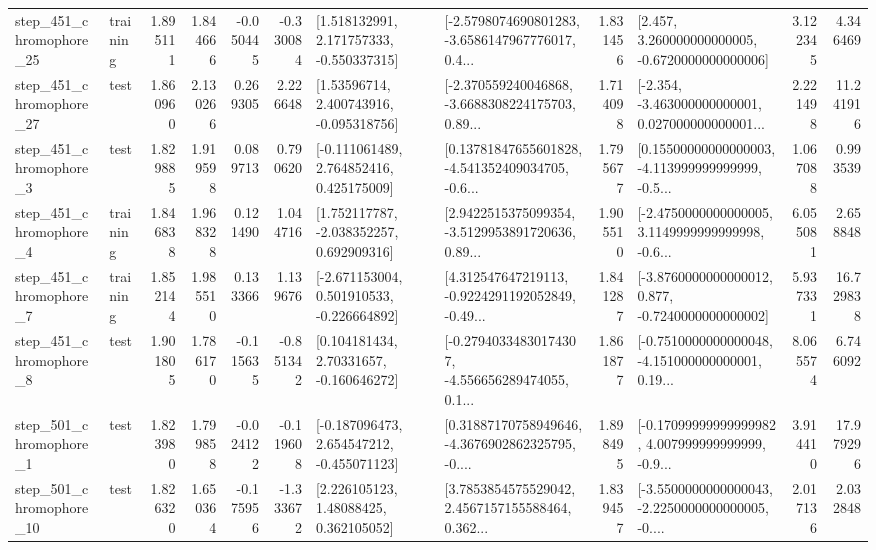 \begin{tabular}{llrrrrllrlrr}
  step\_451\_chromophore\_25 &  training &      1.895111 &    1.844666 &     -0.050445 & -0.330084 &    [1.518132991, 2.171757333, -0.550337315] &  [-2.5798074690801283, -3.6586147967776017, 0.4... &       1.831456 &    [2.457, 3.260000000000005, -0.6720000000000006] &            3.122345 &          4.346469 \\
  step\_451\_chromophore\_27 &      test &      1.860960 &    2.130266 &      0.269305 &  2.226648 &     [1.53596714, 2.400743916, -0.095318756] &  [-2.370559240046868, -3.6688308224175703, 0.89... &       1.714098 &  [-2.354, -3.463000000000001, 0.027000000000001... &            2.221498 &         11.241916 \\
   step\_451\_chromophore\_3 &      test &      1.829885 &    1.919598 &      0.089713 &  0.790620 &    [-0.111061489, 2.764852416, 0.425175009] &  [0.13781847655601828, -4.541352409034705, -0.6... &       1.795677 &  [0.15500000000000003, -4.113999999999999, -0.5... &            1.067088 &          0.993539 \\
   step\_451\_chromophore\_4 &  training &      1.846838 &    1.968328 &      0.121490 &  1.044716 &    [1.752117787, -2.038352257, 0.692909316] &  [2.9422515375099354, -3.5129953891720636, 0.89... &       1.905510 &  [-2.4750000000000005, 3.1149999999999998, -0.6... &            6.055081 &          2.658848 \\
   step\_451\_chromophore\_7 &  training &      1.852144 &    1.985510 &      0.133366 &  1.139676 &   [-2.671153004, 0.501910533, -0.226664892] &  [4.312547647219113, -0.9224291192052849, -0.49... &       1.841287 &  [-3.8760000000000012, 0.877, -0.7240000000000002] &            5.937331 &         16.729838 \\
   step\_451\_chromophore\_8 &      test &      1.901805 &    1.786170 &     -0.115635 & -0.851342 &     [0.104181434, 2.70331657, -0.160646272] &  [-0.27940334830174307, -4.556656289474055, 0.1... &       1.861877 &  [-0.7510000000000048, -4.151000000000001, 0.19... &            8.065574 &          6.746092 \\
   step\_501\_chromophore\_1 &      test &      1.823980 &    1.799858 &     -0.024122 & -0.119608 &   [-0.187096473, 2.654547212, -0.455071123] &  [0.31887170758949646, -4.3676902862325795, -0.... &       1.898495 &  [-0.17099999999999982, 4.007999999999999, -0.9... &            3.914410 &         17.979296 \\
  step\_501\_chromophore\_10 &      test &      1.826320 &    1.650364 &     -0.175956 & -1.333672 &      [2.226105123, 1.48088425, 0.362105052] &  [3.7853854575529042, 2.4567157155588464, 0.362... &       1.839457 &  [-3.5500000000000043, -2.2250000000000005, -0.... &            2.017136 &          2.032848 \\

\end{tabular}
